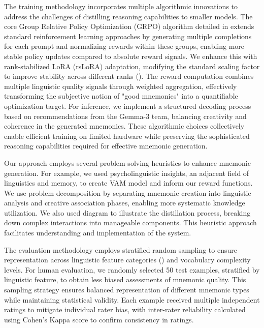  The training methodology incorporates multiple algorithmic innovations to address the challenges of distilling reasoning capabilities to smaller models. The core Group Relative Policy Optimization (GRPO) algorithm detailed in  extends standard reinforcement learning approaches by generating multiple completions for each prompt and normalizing rewards within these groups, enabling more stable policy updates compared to absolute reward signals. We enhance this with rank-stabilized LoRA (rsLoRA) adaptation, modifying the standard scaling factor to improve stability across different ranks (). The reward computation combines multiple linguistic quality signals through weighted aggregation, effectively transforming the subjective notion of "good mnemonics" into a quantifiable optimization target. For inference, we implement a structured decoding process based on recommendations from the Gemma-3 team, balancing creativity and coherence in the generated mnemonics. These algorithmic choices collectively enable efficient training on limited hardware while preserving the sophisticated reasoning capabilities required for effective mnemonic generation.

 Our approach employs several problem-solving heuristics to enhance mnemonic generation. For example, we used psycholinguistic insights, an adjacent field of linguistics and memory, to create VAM model and inform our reward functions. We use problem decomposition by separating mnemonic creation into linguistic analysis and creative association phases, enabling more systematic knowledge utilization. We also used diagram  to illustrate the distillation process, breaking down complex interactions into manageable components. This heuristic approach facilitates understanding and implementation of the system.

 The evaluation methodology employs stratified random sampling to ensure representation across linguistic feature categories () and vocabulary complexity levels. For human evaluation, we randomly selected 50 test examples, stratified by linguistic feature, to obtain less biased assessments of mnemonic quality. This sampling strategy ensures balanced representation of different mnemonic types while maintaining statistical validity. Each example received multiple independent ratings to mitigate individual rater bias, with inter-rater reliability calculated using Cohen's Kappa score to confirm consistency in ratings.


